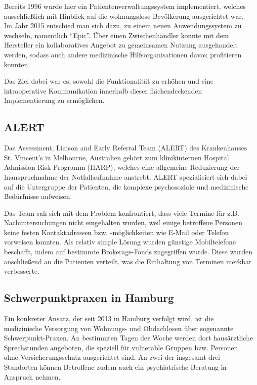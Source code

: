 Bereits 1996 wurde hier ein Patientenverwaltungssystem implementiert, welches ausschließlich mit Hinblick auf die wohnungslose Bevölkerung ausgerichtet war. Im Jahr 2015 entschied man sich dazu, zu einem neuen Anwendungssystem zu wechseln, namentlich \enquote{Epic}. Über einen Zwischenhändler konnte mit dem Hersteller ein kollaboratives Angebot zu gemeinsamen Nutzung ausgehandelt werden, sodass auch andere medizinische Hilfsorganisationen davon profitieren konnten.

Das Ziel dabei war es, sowohl die Funktionalität zu erhöhen und eine intraoperative Kommunikation innerhalb dieser flächendeckenden Implementierung zu ermöglichen. \citep{Angoff.2019}

\subsection{ALERT}

Das Assessment, Liaison and Early Referral Team (ALERT) des Krankenhauses St. Vincent's in Melbourne, Australien gehört zum klinikinternen Hospital Admission Risk Programm (HARP), welches eine allgemeine Reduzierung der Inanspruchnahme der Notfallaufnahme anstrebt. ALERT spezialisiert sich dabei auf die Untergruppe der Patienten, die komplexe psychosoziale und medizinische Bedürfnisse aufweisen.

Das Team sah sich mit dem Problem konfrontiert, dass viele Termine für z.B. Nachuntersuchungen nicht eingehalten wurden, weil einige betroffene Personen keine festen Kontaktadressen bzw. -möglichkeiten wie E-Mail oder Telefon vorweisen konnten. Als relativ simple Lösung wurden günstige Mobiltelefone beschafft, indem auf bestimmte Brokerage-Fonds zugegriffen wurde. Diese wurden anschließend an die Patienten verteilt, was die Einhaltung von Terminen merkbar verbesserte. \citep{Davies.2018}

\subsection{Schwerpunktpraxen in Hamburg}

Ein konkreter Ansatz, der seit 2013 in Hamburg verfolgt wird, ist die medizinische Versorgung von Wohnungs- und Obdachlosen über sogenannte Schwerpunkt-Praxen. An bestimmten Tagen der Woche werden dort hausärztliche Sprechstunden angeboten, die speziell für vulnerable Gruppen bzw. Personen ohne Versicherungsschutz ausgerichtet sind. An zwei der insgesamt drei Standorten können Betroffene zudem auch ein psychiatrische Beratung in Anspruch nehmen.

